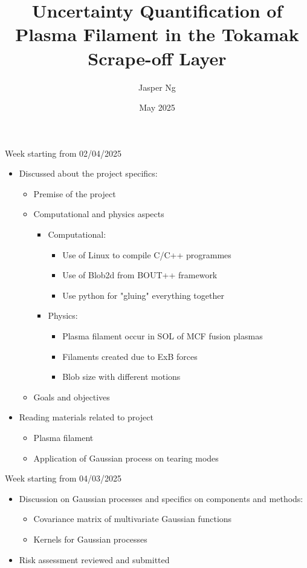 \documentclass{article}
\title{\textbf{Uncertainty Quantification of Plasma Filament in the Tokamak Scrape-off Layer}}
\author{Jasper Ng}
\date{May 2025}
\begin{document}
\maketitle


\begin{arrowlist}
    \item Week starting from 02/04/2025
    \begin{itemize}
        \item Discussed about the project specifics:
        \begin{itemize}
        	\item Premise of the project
        	\item Computational and physics aspects
            \begin{itemize}
        		\item[] Computational:
                \begin{itemize}
        			\item Use of Linux to compile C/C++ programmes
        			\item Use of Blob2d from BOUT++ framework
        			\item Use python for "gluing" everything together
                \end{itemize}
        		\item[] Physics:
                \begin{itemize}
        			\item Plasma filament occur in SOL of MCF fusion plasmas
        			\item Filaments created due to ExB forces
        			\item Blob size with different motions
                \end{itemize}
            \end{itemize}
        	\item Goals and objectives
        \end{itemize}
        \item Reading materials related to project
        \begin{itemize}
        	\item Plasma filament
        	\item Application of Gaussian process on tearing modes
        \end{itemize}
    \end{itemize}
    
    \item Week starting from 04/03/2025
    \begin{itemize}
        \item Discussion on Gaussian processes and specifics on components and methods:
        \begin{itemize}
        	\item Covariance matrix of multivariate Gaussian functions
        	\item Kernels for Gaussian processes
        \end{itemize}
        \item Risk assessment reviewed and submitted
    \end{itemize}
    

\end{arrowlist}
\end{document}
